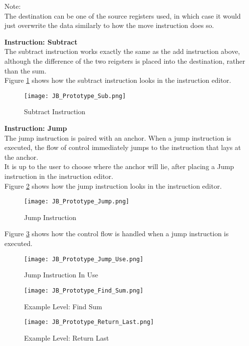 Note:\\
The destination can be one of the source registers used, in which case it would
just overwrite the data similarly to how the move instruction does so.\\
\newpage

\textbf{Instruction: Subtract}\\

The subtract instruction works exactly the same as the add instruction above,
although the difference of the two reigsters is placed into the destination, rather
than the sum.\\

Figure \ref{fig:Sub_Instruction} shows how the subtract instruction looks in the
instruction editor.

\begin{figure}[!hb]
  \caption{Subtract Instruction}
  \label{fig:Sub_Instruction}
  \centering
  \texttt{[image: JB\_Prototype\_Sub.png]}
\end{figure}

\textbf{Instruction: Jump}\\

The jump instruction is paired with an anchor. When a jump instruction is executed,
the flow of control immediately jumps to the instruction that lays at the anchor.\\

It is up to the user to choose where the anchor will lie, after placing a Jump instruction
in the instruction editor.\\

Figure \ref{fig:Jump_Instruction} shows how the jump instruction looks in the
instruction editor.

\begin{figure}[!hb]
  \caption{Jump Instruction}
  \label{fig:Jump_Instruction}
  \centering
  \texttt{[image: JB\_Prototype\_Jump.png]}
\end{figure}

Figure \ref{fig:Jump_Instruction_Use} shows how the control flow is handled when a jump instruction is
executed.

\begin{figure}[!hb]
  \caption{Jump Instruction In Use}
  \label{fig:Jump_Instruction_Use}
  \centering
  \texttt{[image: JB\_Prototype\_Jump\_Use.png]}
\end{figure}
\vfill
\clearpage

\begin{figure}[!hb]
  \caption{Example Level: Find Sum}
  \label{fig:Find_Sum}
  \centering
  \texttt{[image: JB\_Prototype\_Find\_Sum.png]}
\end{figure}
\vfill
\clearpage

\begin{figure}[!hb]
  \caption{Example Level: Return Last}
  \label{fig:Return_Last}
  \centering
  \texttt{[image: JB\_Prototype\_Return\_Last.png]}
\end{figure}
\vfill
\clearpage

\newpage
